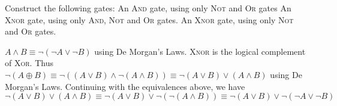 \documentclass[solution, letterpaper]{cs20}
\begin{document}
        Construct the following gates:
        \subproblem An \textsc{And} gate, using only \textsc{Not} and \textsc{Or} gates
        \subproblem An \textsc{Xnor} gate, using only \textsc{And}, \textsc{Not} and \textsc{Or} gates.
        \subproblem An \textsc{Xnor} gate, using only \textsc{Not} and \textsc{Or} gates.

        \begin{solution}
        \subsolution $A \land B \equiv \lnot (\lnot A \lor \lnot B)$ using De Morgan's Laws.
        \subsolution \textsc{Xnor} is the logical complement of \textsc{Xor}. Thus $\lnot (A \oplus B) \equiv \lnot((A \lor B) \land \lnot (A \land B)) \equiv \lnot (A \lor B) \lor (A \land B)$ using De Morgan's Laws.
        \subsolution Continuing with the equivalences above, we have $\lnot (A \lor B) \lor (A \land B) \equiv \lnot (A \lor B) \lor \lnot (\lnot (A \land B)) \equiv \lnot (A \lor B) \lor \lnot (\lnot A \lor \lnot B)$
        \end{solution}
\end{document}
